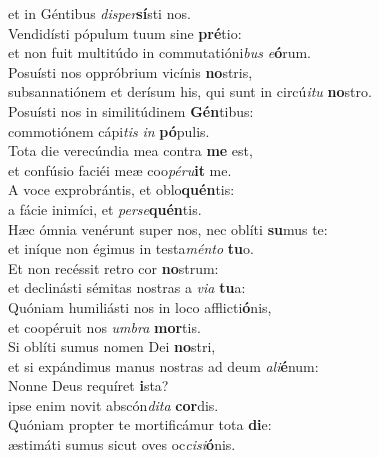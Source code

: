 \oddverse et in Géntibus \textit{di}\textit{sper}\textbf{sí}sti nos.\\
\evenverse Vendidísti pópulum tuum sine \textbf{pré}tio:~\*\\
\evenverse et non fuit multitúdo in commutatióni\textit{bus} \textit{e}\textbf{ó}rum.\\
\oddverse Posuísti nos oppróbrium vicínis \textbf{no}stris,~\*\\
\oddverse subsannatiónem et derísum his, qui sunt in circú\textit{i}\textit{tu} \textbf{no}stro.\\
\evenverse Posuísti nos in similitúdinem \textbf{Gén}tibus:~\*\\
\evenverse commotiónem cápi\textit{tis} \textit{in} \textbf{pó}pulis.\\
\oddverse Tota die verecúndia mea contra \textbf{me} est,~\*\\
\oddverse et confúsio faciéi meæ coo\textit{pé}\textit{ru}\textbf{it} me.\\
\evenverse A voce exprobrántis, et oblo\textbf{quén}tis:~\*\\
\evenverse a fácie inimíci, et \textit{per}\textit{se}\textbf{quén}tis.\\
\oddverse Hæc ómnia venérunt super nos, nec oblíti \textbf{su}mus te:~\*\\
\oddverse et iníque non égimus in testa\textit{mén}\textit{to} \textbf{tu}o.\\
\evenverse Et non recéssit retro cor \textbf{no}strum:~\*\\
\evenverse et declinásti sémitas nostras a \textit{vi}\textit{a} \textbf{tu}a:\\
\oddverse Quóniam humiliásti nos in loco afflicti\textbf{ó}nis,~\*\\
\oddverse et coopéruit nos \textit{um}\textit{bra} \textbf{mor}tis.\\
\evenverse Si oblíti sumus nomen Dei \textbf{no}stri,~\*\\
\evenverse et si expándimus manus nostras ad deum \textit{a}\textit{li}\textbf{é}num:\\
\oddverse Nonne Deus requíret \textbf{i}sta?~\*\\
\oddverse ipse enim novit abscón\textit{di}\textit{ta} \textbf{cor}dis.\\
\evenverse Quóniam propter te mortificámur tota \textbf{di}e:~\*\\
\evenverse æstimáti sumus sicut oves oc\textit{ci}\textit{si}\textbf{ó}nis.\\
